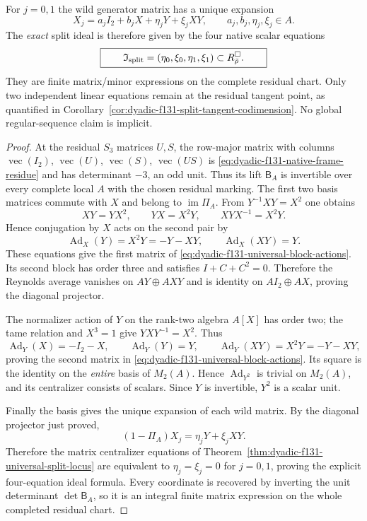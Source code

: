 \begin{theorem}
For $j=0,1$ the wild
generator matrix has
a unique expansion
\begin{equation}\label{eq:dyadic-f131-wild-native-components}
\boxed{
X_j=a_j I_2+b_j X
+\eta_jY+\xi_jXY,
\qquad
a_j,b_j,\eta_j,\xi_j\in A.
}
\end{equation}
The \emph{exact} split
ideal is therefore
given by the four
native scalar
equations
\begin{equation}\label{eq:dyadic-f131-four-scalar-split-ideal}
\boxed{\qquad
\mathfrak I_{\rm split}
=(\eta_0,\xi_0,\eta_1,\xi_1)
\subset R_{\bar\rho}^{\square}.
\qquad}
\end{equation}
They are finite
matrix/minor
expressions on
the complete
residual chart.
Only two independent
linear equations
remain at the
residual tangent
point, as quantified
in
Corollary~\ref{cor:dyadic-f131-split-tangent-codimension}.
No global regular-sequence
claim is implicit.
\end{theorem}

\begin{proof}
At the residual
$S_3$ matrices
$U,S$, the
row-major matrix
with columns
$\operatorname{vec}(I_2)$,
$\operatorname{vec}(U)$,
$\operatorname{vec}(S)$,
$\operatorname{vec}(US)$
is
\eqref{eq:dyadic-f131-native-frame-residue}
and has determinant
$-3$, an odd unit.
Thus its lift
$\mathsf B_A$
is invertible
over every complete
local $A$ with
the chosen residual
marking.
The first two
basis matrices
commute with
$X$ and belong
to $\operatorname{im}\Pi_A$.
From $Y^{-1}XY=X^2$
one obtains
\[
XY=YX^2,\qquad
YX=X^2Y,\qquad
XYX^{-1}=X^2Y.
\]
Hence conjugation
by $X$ acts on the
second pair by
\[
\operatorname{Ad}_X(Y)
=X^2Y=-Y-XY,\qquad
\operatorname{Ad}_X(XY)=Y.
\]
These equations
give the first
matrix of
\eqref{eq:dyadic-f131-universal-block-actions}.
Its second block
has order three
and satisfies
$I+C+C^2=0$.
Therefore the
Reynolds average
vanishes on
$AY\oplus AXY$
and is identity
on $AI_2\oplus AX$,
proving the
diagonal projector.

The normalizer
action of $Y$ on
the rank-two
algebra $A[X]$
has order two;
the tame relation
and $X^3=1$
give
$YXY^{-1}=X^2$.
Thus
\[
\operatorname{Ad}_Y(X)
=-I_2-X,\qquad
\operatorname{Ad}_Y(Y)=Y,\qquad
\operatorname{Ad}_Y(XY)
=X^2Y=-Y-XY,
\]
proving the
second matrix in
\eqref{eq:dyadic-f131-universal-block-actions}.
Its square is the
identity on the
\emph{entire}
basis of $M_2(A)$.
Hence
$\operatorname{Ad}_{Y^2}$
is trivial on
$M_2(A)$, and
its centralizer
consists of scalars.
Since $Y$ is
invertible,
$Y^2$ is a
scalar unit.

Finally the
basis gives
the unique
expansion of
each wild matrix.
By the diagonal
projector just proved,
\[
(1-\Pi_A)X_j
=\eta_jY+\xi_jXY.
\]
Therefore the
matrix centralizer
equations of
Theorem~\ref{thm:dyadic-f131-universal-split-locus}
are equivalent
to $\eta_j=\xi_j=0$
for $j=0,1$,
proving the
explicit four-equation
ideal formula.
Every coordinate
is recovered by
inverting the
unit determinant
$\det\mathsf B_A$,
so it is an
integral finite
matrix expression
on the whole
completed residual
chart.
\end{proof}

